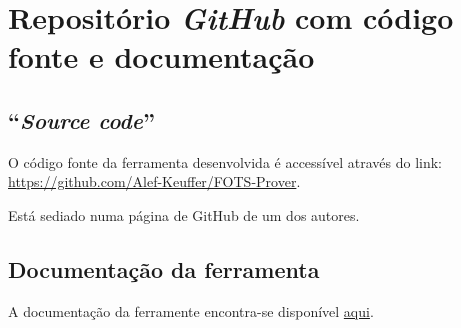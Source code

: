 \documentclass[11pt,a4paper]{report}%
\begin{document}
\chapter{Repositório \textit{GitHub} com código fonte e documentação} \label{apndx:github}

\section*{``\textit{Source code}''}

O código fonte da ferramenta desenvolvida é accessível através do link: \url{https://github.com/Alef-Keuffer/FOTS-Prover}.

Está sediado numa página de GitHub de um dos autores.

\section*{Documentação da ferramenta}

A documentação da ferramente encontra-se disponível \href{https://alef-keuffer.github.io/FOTS-Prover.docs/backend.html}{aqui}.

\newpage



\end{document}
